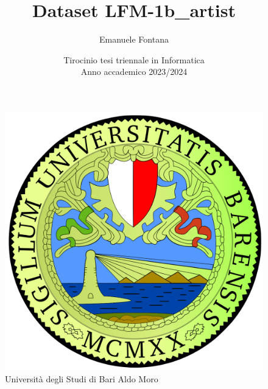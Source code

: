 \documentclass[12pt]{article}
\begin{document}

    \pagestyle{fancy}
    \everymath{\displaystyle}
    \sffamily
    \begin{figure}
        \centering
        \includegraphics[scale=0.1]{uniba-logo.png}
        \caption*{Università degli Studi di Bari Aldo Moro}
    \end{figure}
    
    \title{Dataset LFM-1b\_artist}
    \author{Emanuele Fontana}
    \date{Tirocinio tesi triennale in Informatica\\Anno accademico 2023/2024}
    \maketitle

    \tableofcontents\newpage

    
    \newpage
    

    \newpage
    
    \newpage
    
    \newpage
    
\end{document}
